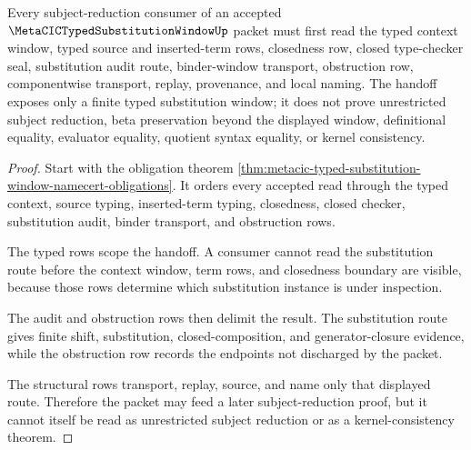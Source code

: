 \begin{theorem}
\label{thm:metacic-typed-substitution-window-subject-reduction-handoff}
Every subject-reduction consumer of an accepted $\MetaCICTypedSubstitutionWindowUp$ packet must first read the typed context window, typed source and inserted-term rows, closedness row, closed type-checker seal, substitution audit route, binder-window transport, obstruction row, componentwise transport, replay, provenance, and local naming. The handoff exposes only a finite typed substitution window; it does not prove unrestricted subject reduction, beta preservation beyond the displayed window, definitional equality, evaluator equality, quotient syntax equality, or kernel consistency.
\end{theorem}
\begin{proof}
Start with the obligation theorem \autoref{thm:metacic-typed-substitution-window-namecert-obligations}. It orders every accepted read through the typed context, source typing, inserted-term typing, closedness, closed checker, substitution audit, binder transport, and obstruction rows.

The typed rows scope the handoff. A consumer cannot read the substitution route before the context window, term rows, and closedness boundary are visible, because those rows determine which substitution instance is under inspection.

The audit and obstruction rows then delimit the result. The substitution route gives finite shift, substitution, closed-composition, and generator-closure evidence, while the obstruction row records the endpoints not discharged by the packet.

The structural rows transport, replay, source, and name only that displayed route. Therefore the packet may feed a later subject-reduction proof, but it cannot itself be read as unrestricted subject reduction or as a kernel-consistency theorem.
\end{proof}



